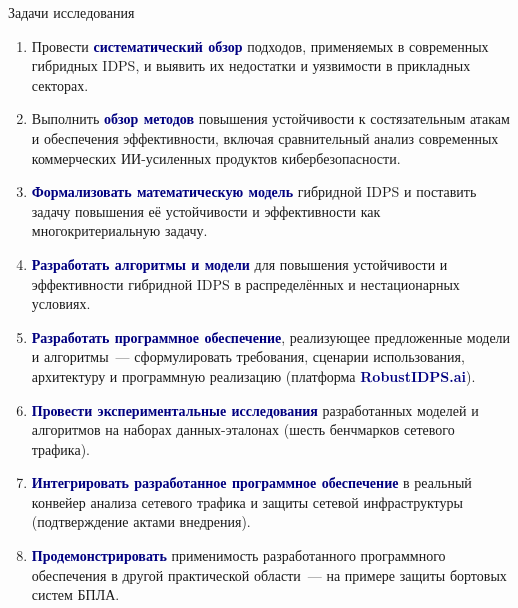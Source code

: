 \documentclass[10pt,aspectratio=169]{beamer}
\newcommand{\bn}[1]{\textcolor{navy}{\textbf{#1}}}
\begin{document}
\begin{frame}{Задачи исследования}
\footnotesize
\begin{enumerate}\setlength\itemsep{2pt}
\item Провести \bn{систематический обзор} подходов, применяемых
в современных гибридных IDPS, и выявить их недостатки и
уязвимости в прикладных секторах.

\item Выполнить \bn{обзор методов} повышения устойчивости к
состязательным атакам и обеспечения эффективности, включая
сравнительный анализ современных коммерческих
ИИ-усиленных продуктов кибербезопасности.

\item \bn{Формализовать математическую модель} гибридной IDPS
и поставить задачу повышения её устойчивости и эффективности
как многокритериальную задачу.

\item \bn{Разработать алгоритмы и модели} для повышения
устойчивости и эффективности гибридной IDPS в распределённых и
нестационарных условиях.

\item \bn{Разработать программное обеспечение}, реализующее
предложенные модели и алгоритмы~--- сформулировать
требования, сценарии использования, архитектуру и программную
реализацию (платформа \bn{RobustIDPS.ai}).

\item \bn{Провести экспериментальные исследования}
разработанных моделей и алгоритмов на наборах данных-эталонах
(шесть бенчмарков сетевого трафика).

\item \bn{Интегрировать разработанное программное обеспечение}
в реальный конвейер анализа сетевого трафика и защиты сетевой
инфраструктуры (подтверждение актами внедрения).

\item \bn{Продемонстрировать} применимость разработанного
программного обеспечения в другой практической области~---
на примере защиты бортовых систем БПЛА.
\end{enumerate}
\end{frame}
\end{document}
